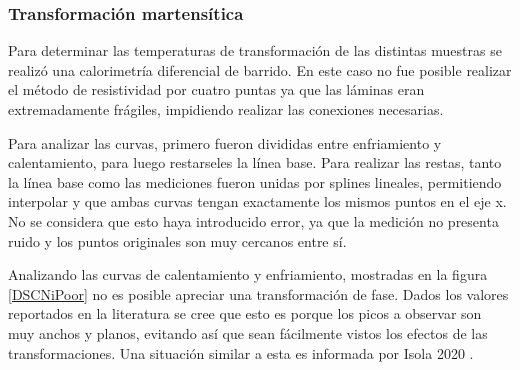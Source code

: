 \documentclass[12pt]{article}
\theoremstyle{definition}
\theoremstyle{remark}
\begin{document}
{\subsubsection{Transformación martensítica}
Para determinar las temperaturas de transformación de las distintas muestras se realizó una calorimetría diferencial de barrido. En este caso no fue posible realizar el método de resistividad por cuatro puntas ya que las láminas eran extremadamente frágiles, impidiendo realizar las conexiones necesarias.

Para analizar las curvas, primero fueron divididas entre enfriamiento y calentamiento, para luego restarseles la línea base. Para realizar las restas, tanto la línea base como las mediciones fueron unidas por splines lineales, permitiendo interpolar y que ambas curvas tengan exactamente los mismos puntos en el eje x. No se considera que esto haya introducido error, ya que la medición no presenta ruido y los puntos originales son muy cercanos entre sí.

Analizando las curvas de calentamiento y enfriamiento, mostradas en la figura \ref{DSCNiPoor} no es posible apreciar una transformación de fase. Dados los valores reportados en la literatura se cree que esto es porque los picos a observar son muy anchos y planos, evitando así que sean fácilmente vistos los efectos de las transformaciones. Una situación similar a esta es informada por Isola 2020 \cite{Isola2020}.

}
\end{document}
